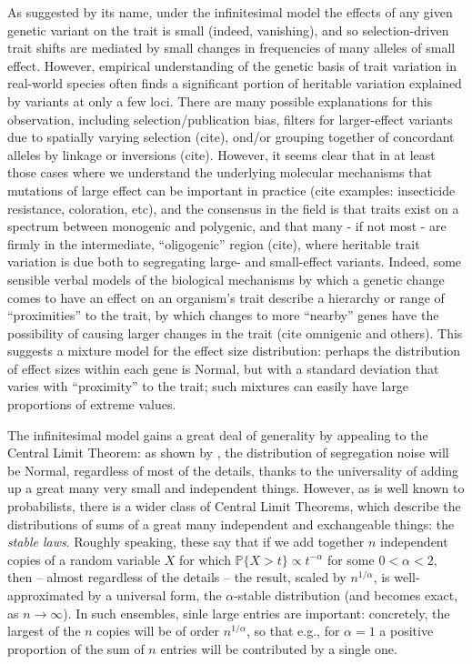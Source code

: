 \documentclass{article}
\renewcommand{\P}{\mathbb{P}}
\theoremstyle{remark}
\theoremstyle{definition}
\begin{document}
As suggested by its name, under the infinitesimal model the effects of any given genetic variant on the trait
is small (indeed, vanishing),
and so selection-driven trait shifts are mediated by small changes in frequencies of many alleles of small effect.
However, empirical understanding of the genetic basis of trait variation in real-world species
often finds a significant portion of heritable variation explained by variants at only a few loci.
There are many possible explanations for this observation,
including selection/publication bias,
filters for larger-effect variants due to spatially varying selection (cite),
ond/or grouping together of concordant alleles by linkage or inversions (cite).
However, it seems clear that in at least those cases where we understand the underlying molecular mechanisms
that mutations of large effect can be important in practice
(cite examples: insecticide resistance, coloration, etc),
and the consensus in the field is that traits exist on a spectrum between monogenic and polygenic,
and that many - if not most - are firmly in the intermediate, ``oligogenic'' region (cite),
where heritable trait variation is due both to segregating large- and small-effect variants.
Indeed, some sensible verbal models of the biological mechanisms by which a genetic change
comes to have an effect on an organism's trait
describe a hierarchy or range of ``proximities'' to the trait,
by which changes to more ``nearby'' genes have the possibility of causing larger changes in the trait
(cite omnigenic and others).
This suggests a mixture model for the effect size distribution:
perhaps the distribution of effect sizes within each gene is Normal,
but with a standard deviation that varies with ``proximity'' to the trait;
such mixtures can easily have large proportions of extreme values.

The infinitesimal model gains a great deal of generality by appealing to the Central Limit Theorem:
as shown by \citet{barton2017infinitesimal},
the distribution of segregation noise will be Normal, regardless of most of the details,
thanks to the universality of adding up a great many very small and independent things.
However, as is well known to probabilists,
there is a wider class of Central Limit Theorems,
which describe the distributions of sums of a great many independent and exchangeable things:
the \emph{stable laws}.
Roughly speaking, these say that if we add together $n$ independent copies of a random variable $X$
for which $\P\{ X > t \} \propto t^{-\alpha}$ for some $0 < \alpha < 2$,
then -- almost regardless of the details -- the result, scaled by $n^{1/\alpha}$,
is well-approximated by a universal form, the $\alpha$-stable distribution (and becomes exact, as $n \to \infty$).
In such ensembles, sinle large entries are important:
concretely, the largest of the $n$ copies will be of order $n^{1/\alpha}$,
so that e.g., for $\alpha=1$ a positive proportion of the sum of $n$ entries will be contributed by a single one.
\end{document}
